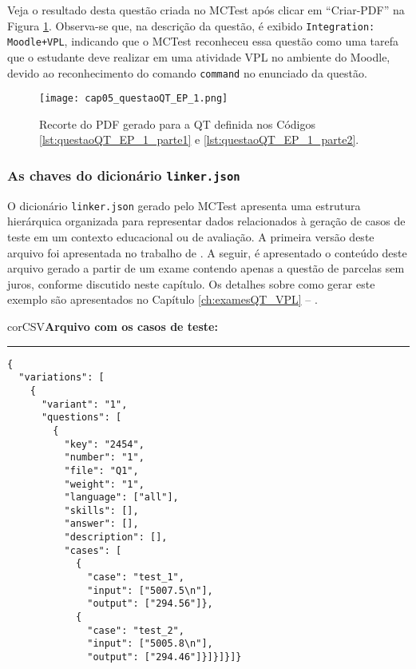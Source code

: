 Veja o resultado desta questão criada no MCTest após clicar em ``Criar-PDF'' na Figura \ref{fig:cap05_questaoQT_EP_1}. Observa-se que, na descrição da questão, é exibido \verb|Integration: Moodle+VPL|, indicando que o MCTest reconheceu essa questão como uma tarefa que o estudante deve realizar em uma atividade VPL no ambiente do Moodle, devido ao reconhecimento do comando \verb|command| no enunciado da questão.

\begin{figure}[!ht]
  \texttt{[image: cap05\_questaoQT\_EP\_1.png]}
  \caption{Recorte do PDF gerado para a QT definida nos Códigos \ref{lst:questaoQT_EP_1_parte1} e \ref{lst:questaoQT_EP_1_parte2}.}
  \label{fig:cap05_questaoQT_EP_1}
\end{figure}

\subsubsection{As chaves do dicionário \texttt{linker.json}} 


O dicionário \verb|linker.json| gerado pelo MCTest apresenta uma estrutura hierárquica organizada para representar dados relacionados à geração de casos de teste em um contexto educacional ou de avaliação. A primeira versão deste arquivo foi apresentada no trabalho de . A seguir, é apresentado o conteúdo deste arquivo gerado a partir de um exame contendo apenas a questão de parcelas sem juros, conforme discutido neste capítulo. Os detalhes sobre como gerar este exemplo são apresentados no Capítulo \ref{ch:examesQT_VPL} -- .

\begin{myboxCode}{corCSV}{\textbf{Arquivo com os casos de teste:}}\vspace{3mm}
    \hrule
    \begin{verbatim}
{
  "variations": [
    {
      "variant": "1",
      "questions": [
        {
          "key": "2454",
          "number": "1",
          "file": "Q1",
          "weight": "1",
          "language": ["all"],
          "skills": [],
          "answer": [],
          "description": [],
          "cases": [
            {
              "case": "test_1",
              "input": ["5007.5\n"],
              "output": ["294.56"]},
            {
              "case": "test_2",
              "input": ["5005.8\n"],
              "output": ["294.46"]}]}]}]}
\end{verbatim}
\end{myboxCode}


